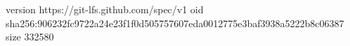 version https://git-lfs.github.com/spec/v1
oid sha256:906232fc9722a24e23f1f0d505757607eda0012775e3baf3938a5222b8c06387
size 332580
